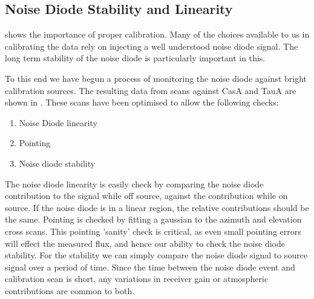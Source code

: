 

 

\subsection{Noise Diode Stability and Linearity}

 shows the importance of proper calibration. Many of the choices available to us in calibrating the data rely on injecting a well understood noise diode signal. The long term stability of the noise diode is particularly important in this.

To this end we have begun a process of monitoring the noise diode against bright calibration sources. The resulting data from scans against CasA and TauA are shown in . These scans have been optimised to allow the following checks:

\begin{enumerate}
 \item Noise Diode linearity
 \item Pointing
 \item Noise diode stability
 \end{enumerate}

The noise diode linearity is easily check by comparing the noise diode contribution to the signal while off source, against the contribution while on source. If the noise diode is in a linear region, the relative contributions should be the same. Pointing is checked by fitting a gaussian to the azimuth and elevation cross scans. This pointing 'sanity' check is critical, as even small pointing errors will effect the measured flux, and hence our ability to check the noise diode stability. For the stability we can simply compare the noise diode signal to source signal over a period of time. Since the time between the noise diode event and calibration scan is short, any variations in receiver gain or atmospheric contributions are  common to both. 


